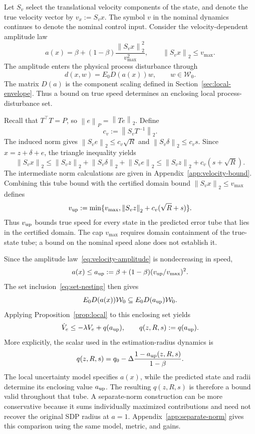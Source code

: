\documentclass[11pt,a4paper]{article}
\numberwithin{equation}{section}
\theoremstyle{remark}\newtheorem{remark}{Remark}
\newcommand{\norm}[1]{\left\lVert#1\right\rVert}
\newcommand{\cW}{\mathcal W}
\begin{document}
Let $S_v$ select the translational velocity components of the state, and denote the true velocity vector by $v_x:=S_vx$. The symbol $v$ in the nominal dynamics continues to denote the nominal control input.
Consider the velocity-dependent amplitude law
\begin{equation}\label{eq:velocity-amplitude}
a(x)=\beta+(1-\beta)\frac{\norm{S_vx}_2^2}{v_{\max}^2},\qquad
\norm{S_vx}_2\le v_{\max}.
\end{equation}
The amplitude enters the physical process disturbance through
\[
d(x,w)=E_0D(a(x))w,\qquad w\in\cW_0.
\]
The matrix $D(a)$ is the component scaling defined in Section~\ref{sec:local-envelope}. Thus a bound on true speed determines an enclosing local process-disturbance set.

Recall that $T^\top T=P$, so $\norm e_P=\norm{Te}_2$. Define
\begin{equation}\label{eq:velocity-metric-factor}
c_v:=\norm{S_vT^{-1}}_2.
\end{equation}
The induced norm gives $\norm{S_ve}_2\le c_v\sqrt R$ and $\norm{S_v\delta}_2\le c_vs$. Since $x=z+\delta+e$, the triangle inequality yields
\[
\norm{S_vx}_2\le\norm{S_vz}_2+\norm{S_v\delta}_2+\norm{S_ve}_2
\le\norm{S_vz}_2+c_v(s+\sqrt R).
\]
The intermediate norm calculations are given in Appendix~\ref{app:velocity-bound}.
Combining this tube bound with the certified domain bound $\norm{S_vx}_2\le v_{\max}$ defines
\begin{equation}\label{eq:local-speed-bound}
v_{\rm up}:=\min\{v_{\max},\norm{S_vz}_2+c_v(\sqrt R+s)\}.
\end{equation}
Thus $v_{\rm up}$ bounds true speed for every state in the predicted error tube that lies in the certified domain. The cap $v_{\max}$ requires domain containment of the true-state tube; a bound on the nominal speed alone does not establish it.

Since the amplitude law~\eqref{eq:velocity-amplitude} is nondecreasing in speed,
\begin{equation}\label{eq:local-amplitude-bound}
a(x)\le a_{\rm up}:=\beta+(1-\beta)(v_{\rm up}/v_{\max})^2.
\end{equation}
The set inclusion~\eqref{eq:set-nesting} then gives
\[
E_0D(a(x))\cW_0\subseteq E_0D(a_{\rm up})\cW_0.
\]
Applying Proposition~\ref{prop:local} to this enclosing set yields
\begin{equation}\label{eq:local-observer-bound}
\dot V_e\le-\lambda V_e+q(a_{\rm up}),\qquad
q(z,R,s):=q(a_{\rm up}).
\end{equation}
More explicitly, the scalar used in the estimation-radius dynamics is
\[
q(z,R,s)=q_0-\Delta\frac{1-a_{\rm up}(z,R,s)}{1-\beta}.
\]
The local uncertainty model specifies $a(x)$, while the predicted state and radii determine its enclosing value $a_{\rm up}$. The resulting $q(z,R,s)$ is therefore a bound valid throughout that tube.
A separate-norm construction can be more conservative because it sums individually maximized contributions and need not recover the original SDP radius at $a=1$. Appendix~\ref{app:separate-norm} gives this comparison using the same model, metric, and gains.
\end{document}
